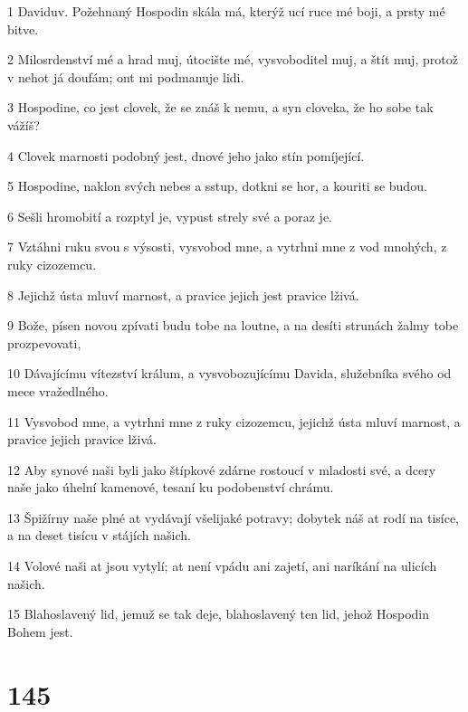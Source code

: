 \par 1 Daviduv. Požehnaný Hospodin skála má, kterýž ucí ruce mé boji, a prsty mé bitve.
\par 2 Milosrdenství mé a hrad muj, útocište mé, vysvoboditel muj, a štít muj, protož v nehot já doufám; ont mi podmanuje lidi.
\par 3 Hospodine, co jest clovek, že se znáš k nemu, a syn cloveka, že ho sobe tak vážíš?
\par 4 Clovek marnosti podobný jest, dnové jeho jako stín pomíjející.
\par 5 Hospodine, naklon svých nebes a sstup, dotkni se hor, a kouriti se budou.
\par 6 Sešli hromobití a rozptyl je, vypust strely své a poraz je.
\par 7 Vztáhni ruku svou s výsosti, vysvobod mne, a vytrhni mne z vod mnohých, z ruky cizozemcu.
\par 8 Jejichž ústa mluví marnost, a pravice jejich jest pravice lživá.
\par 9 Bože, písen novou zpívati budu tobe na loutne, a na desíti strunách žalmy tobe prozpevovati,
\par 10 Dávajícímu vítezství králum, a vysvobozujícímu Davida, služebníka svého od mece vražedlného.
\par 11 Vysvobod mne, a vytrhni mne z ruky cizozemcu, jejichž ústa mluví marnost, a pravice jejich pravice lživá.
\par 12 Aby synové naši byli jako štípkové zdárne rostoucí v mladosti své, a dcery naše jako úhelní kamenové, tesaní ku podobenství chrámu.
\par 13 Špižírny naše plné at vydávají všelijaké potravy; dobytek náš at rodí na tisíce, a na deset tisícu v stájích našich.
\par 14 Volové naši at jsou vytylí; at není vpádu ani zajetí, ani naríkání na ulicích našich.
\par 15 Blahoslavený lid, jemuž se tak deje, blahoslavený ten lid, jehož Hospodin Bohem jest.

\chapter{145}

